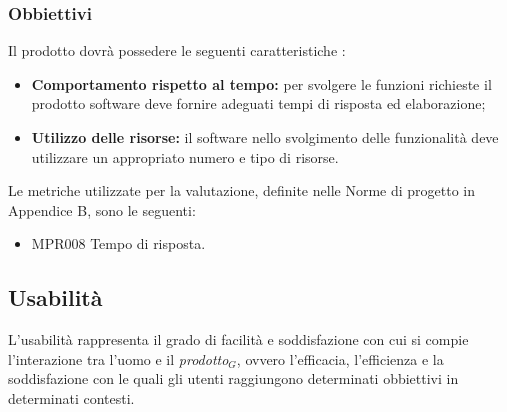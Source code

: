 \subsubsection{Obbiettivi } Il prodotto dovrà possedere le seguenti caratteristiche :
\begin{itemize}
	\item \textbf{Comportamento rispetto al tempo:} per svolgere le  funzioni richieste il prodotto software deve fornire adeguati tempi di risposta ed elaborazione;
	\item \textbf{Utilizzo delle risorse:} il software nello svolgimento delle funzionalità deve utilizzare un appropriato numero e tipo di risorse.
\end{itemize}
Le metriche utilizzate per la valutazione, definite nelle Norme di progetto in Appendice B, sono le seguenti:
\begin{itemize}
	\item MPR008 Tempo di risposta.
\end{itemize}

\subsection{Usabilità}
L'usabilità rappresenta il grado di facilità e soddisfazione con cui si compie l'interazione tra l'uomo e il \textit{prodotto$_{G}$}, ovvero l'efficacia, l'efficienza e la soddisfazione con le quali gli utenti raggiungono determinati obbiettivi in determinati contesti.
